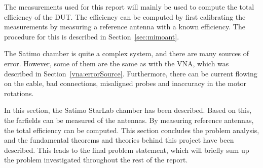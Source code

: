 The measurements used for this report will mainly be used to compute the total efficiency of the DUT.
The efficiency can be computed by first calibrating the measurements by measuring a reference antenna with a known efficiency. The procedure for this is described in Section~\ref{sec:mimoant}.

The Satimo chamber is quite a complex system, and there are many sources of error. However, some of them are the same as with the VNA, which was described in Section~\ref{vna:errorSource}. Furthermore, there can be current flowing on the cable, bad connections, misaligned probes and inaccuracy in the motor rotations. 

\begin{aautail}
In this section, the Satimo StarLab chamber has been described. Based on this, the farfields can be measured of the antennas. By measuring reference antennas, the total efficiency can be computed. 
This section concludes the problem analysis, and the fundamental theorems and theories behind this project have been described. This leads to the final problem statement, which will briefly sum up the problem investigated throughout the rest of the report.
\end{aautail}
